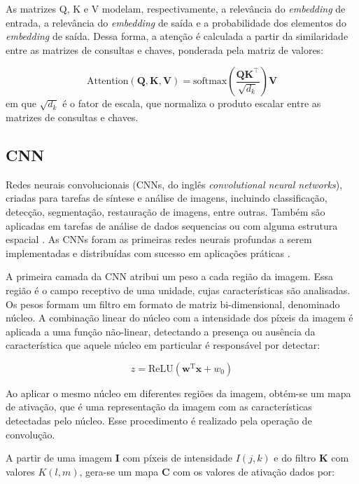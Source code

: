 As matrizes Q, K e V modelam, respectivamente, a
relevância do \textit{embedding} de entrada, a relevância do \textit{embedding}
de saída e a probabilidade dos elementos do \textit{embedding} de saída.
Dessa forma, a atenção é calculada a partir da similaridade entre as matrizes de
consultas e chaves, ponderada pela matriz de valores:

\begin{equation}
    \text{Attention}(\mathbf{Q}, \mathbf{K}, \mathbf{V}) = \text{softmax}(\frac{\mathbf{QK}^\top}{\sqrt{d_k}})\mathbf{V}
\end{equation}
em que $\sqrt{d_k}$ é o fator de escala, que normaliza o produto escalar entre
as matrizes de consultas e chaves.

\subsection{CNN}
Redes neurais convolucionais (CNNs, do inglês \textit{convolutional neural
networks}), criadas para tarefas de síntese e análise de imagens, incluindo
classificação, detecção, segmentação, restauração de imagens, entre outras.
Também são aplicadas em tarefas de análise de dados sequencias ou com alguma
estrutura espacial \cite{Bishop:DeepLearning24}. As CNNs foram as primeiras
redes neurais profundas a serem implementadas e distribuídas com sucesso em
aplicações práticas \cite{lecun1989}.

A primeira camada da CNN atribui um peso a cada região da imagem. Essa região é
o campo receptivo de uma unidade, cujas características são analisadas.
Os pesos formam um filtro em formato de matriz bi-dimensional, denominado
núcleo. A combinação linear do núcleo com a intensidade dos píxeis da imagem é
aplicada a uma função não-linear, detectando a presença ou ausência da
característica que aquele núcleo em particular é responsável por detectar:

\begin{equation}
    z = \text{ReLU}(\mathbf{w}^\text{T} \mathbf{x} + w_0)
\end{equation}

Ao aplicar o mesmo núcleo em diferentes regiões da imagem, obtém-se um mapa de
ativação, que é uma representação da imagem com as características detectadas
pelo núcleo. Esse procedimento é realizado pela operação de convolução.

A partir de uma imagem $\mathbf{I}$ com píxeis de intensidade $I(j, k)$
e do filtro $\mathbf{K}$ com valores $K(l, m)$, gera-se um mapa $\mathbf{C}$ com
os valores de ativação dados por:


